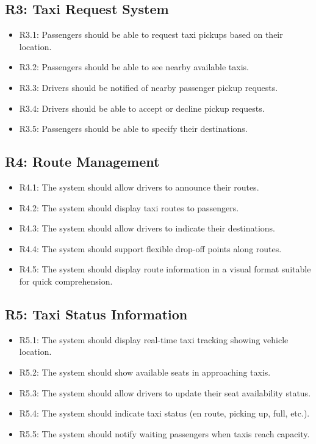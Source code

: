 \documentclass[a4paper,12pt]{article}
\begin{document}
\subsection*{R3: Taxi Request System}
\begin{itemize}
    \item R3.1: Passengers should be able to request taxi pickups based on their location.
    \item R3.2: Passengers should be able to see nearby available taxis.
    \item R3.3: Drivers should be notified of nearby passenger pickup requests.
    \item R3.4: Drivers should be able to accept or decline pickup requests.
    \item R3.5: Passengers should be able to specify their destinations.
\end{itemize}

\subsection*{R4: Route Management}
\begin{itemize}
    \item R4.1: The system should allow drivers to announce their routes.
    \item R4.2: The system should display taxi routes to passengers.
    \item R4.3: The system should allow drivers to indicate their destinations.
    \item R4.4: The system should support flexible drop-off points along routes.
    \item R4.5: The system should display route information in a visual format suitable for quick comprehension.
\end{itemize}

\subsection*{R5: Taxi Status Information}
\begin{itemize}
    \item R5.1: The system should display real-time taxi tracking showing vehicle location.
    \item R5.2: The system should show available seats in approaching taxis.
    \item R5.3: The system should allow drivers to update their seat availability status.
    \item R5.4: The system should indicate taxi status (en route, picking up, full, etc.).
    \item R5.5: The system should notify waiting passengers when taxis reach capacity.
\end{itemize}
\end{document}
